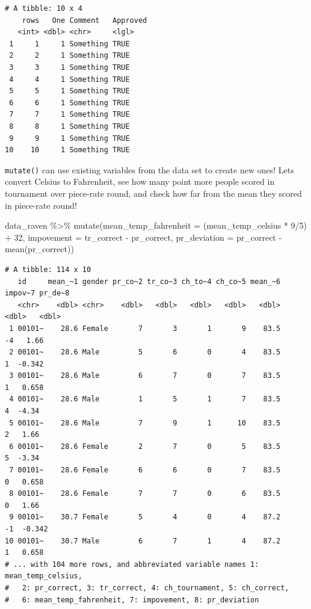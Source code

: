 \documentclass[
  letterpaper,
]{book}
\newenvironment{Shaded}{\begin{snugshade}}{\end{snugshade}}
\newcommand{\AttributeTok}[1]{\textcolor[rgb]{0.40,0.45,0.13}{#1}}
\newcommand{\DecValTok}[1]{\textcolor[rgb]{0.68,0.00,0.00}{#1}}
\newcommand{\FunctionTok}[1]{\textcolor[rgb]{0.28,0.35,0.67}{#1}}
\newcommand{\NormalTok}[1]{\textcolor[rgb]{0.00,0.23,0.31}{#1}}
\newcommand{\SpecialCharTok}[1]{\textcolor[rgb]{0.37,0.37,0.37}{#1}}
\begin{document}
\begin{verbatim}
# A tibble: 10 x 4
    rows   One Comment   Approved
   <int> <dbl> <chr>     <lgl>   
 1     1     1 Something TRUE    
 2     2     1 Something TRUE    
 3     3     1 Something TRUE    
 4     4     1 Something TRUE    
 5     5     1 Something TRUE    
 6     6     1 Something TRUE    
 7     7     1 Something TRUE    
 8     8     1 Something TRUE    
 9     9     1 Something TRUE    
10    10     1 Something TRUE    
\end{verbatim}

\texttt{mutate()} can use existing variables from the data set to create
new ones! Lets convert Celsius to Fahrenheit, see how many point more
people scored in tournament over piece-rate round, and check how far
from the mean they scored in piece-rate round!

\begin{Shaded}
\begin{Highlighting}[]
\NormalTok{data\_raven }\SpecialCharTok{\%\textgreater{}\%} \FunctionTok{mutate}\NormalTok{(}\AttributeTok{mean\_temp\_fahrenheit =}\NormalTok{ (mean\_temp\_celsius }\SpecialCharTok{*} \DecValTok{9}\SpecialCharTok{/}\DecValTok{5}\NormalTok{) }\SpecialCharTok{+} \DecValTok{32}\NormalTok{,}
                      \AttributeTok{impovement =}\NormalTok{ tr\_correct }\SpecialCharTok{{-}}\NormalTok{ pr\_correct,}
                      \AttributeTok{pr\_deviation =}\NormalTok{ pr\_correct }\SpecialCharTok{{-}} \FunctionTok{mean}\NormalTok{(pr\_correct))}
\end{Highlighting}
\end{Shaded}

\begin{verbatim}
# A tibble: 114 x 10
   id     mean_~1 gender pr_co~2 tr_co~3 ch_to~4 ch_co~5 mean_~6 impov~7 pr_de~8
   <chr>    <dbl> <chr>    <dbl>   <dbl>   <dbl>   <dbl>   <dbl>   <dbl>   <dbl>
 1 00101~    28.6 Female       7       3       1       9    83.5      -4   1.66 
 2 00101~    28.6 Male         5       6       0       4    83.5       1  -0.342
 3 00101~    28.6 Male         6       7       0       7    83.5       1   0.658
 4 00101~    28.6 Male         1       5       1       7    83.5       4  -4.34 
 5 00101~    28.6 Male         7       9       1      10    83.5       2   1.66 
 6 00101~    28.6 Female       2       7       0       5    83.5       5  -3.34 
 7 00101~    28.6 Female       6       6       0       7    83.5       0   0.658
 8 00101~    28.6 Female       7       7       0       6    83.5       0   1.66 
 9 00101~    30.7 Female       5       4       0       4    87.2      -1  -0.342
10 00101~    30.7 Male         6       7       1       4    87.2       1   0.658
# ... with 104 more rows, and abbreviated variable names 1: mean_temp_celsius,
#   2: pr_correct, 3: tr_correct, 4: ch_tournament, 5: ch_correct,
#   6: mean_temp_fahrenheit, 7: impovement, 8: pr_deviation
\end{verbatim}
\end{document}
